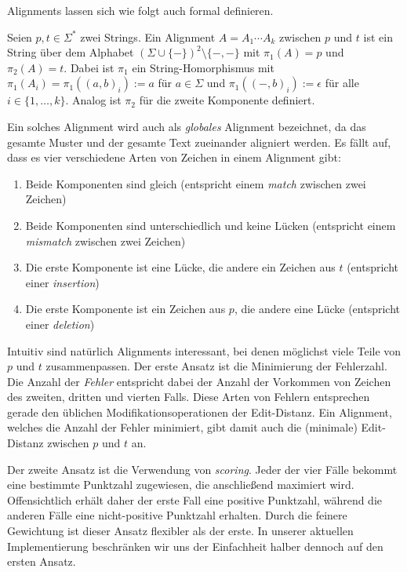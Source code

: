 Alignments lassen sich wie folgt auch formal definieren.

\begin{definition}
\label{def:align:basics:alignment}
Seien $p, t \in \Sigma^*$ zwei Strings. Ein Alignment $A = A_1 \cdots A_k$ zwischen $p$ und $t$ ist ein String über dem Alphabet $\left( \Sigma \cup \{ - \} \right)^2 \setminus \{ -,-\}$ mit $\pi_1(A) = p$ und $\pi_2(A) = t$. Dabei ist $\pi_1$ ein String-Homorphismus mit $\pi_1(A_i) = \pi_1((a,b)_i) := a$ für $a \in \Sigma$ und $\pi_1((-,b)_i) := \epsilon$ für alle $i \in \{1, \ldots, k\}$. Analog ist $\pi_2$ für die zweite Komponente definiert.
\end{definition}

Ein solches Alignment wird auch als \textit{globales} Alignment bezeichnet, da das gesamte Muster und der gesamte Text zueinander aligniert werden. Es fällt auf, dass es vier verschiedene Arten von Zeichen in einem Alignment gibt:

\begin{enumerate}
\item Beide Komponenten sind gleich (entspricht einem \textit{match} zwischen zwei Zeichen)
\item Beide Komponenten sind unterschiedlich und keine Lücken (entspricht einem \textit{mismatch} zwischen zwei Zeichen)
\item Die erste Komponente ist eine Lücke, die andere ein Zeichen aus $t$ (entspricht einer \textit{insertion})
\item Die erste Komponente ist ein Zeichen aus $p$, die andere eine Lücke (entspricht einer \textit{deletion})
\end{enumerate}

Intuitiv sind natürlich Alignments interessant, bei denen möglichst viele Teile von $p$ und $t$ zusammenpassen. Der erste Ansatz ist die Minimierung der Fehlerzahl. Die Anzahl der \textit{Fehler} entspricht dabei der Anzahl der Vorkommen von Zeichen des zweiten, dritten und vierten Falls. Diese Arten von Fehlern entsprechen gerade den üblichen Modifikationsoperationen der Edit-Distanz. Ein Alignment, welches die Anzahl der Fehler minimiert, gibt damit auch die (minimale) Edit-Distanz zwischen $p$ und $t$ an.

Der zweite Ansatz ist die Verwendung von \textit{scoring}. Jeder der vier Fälle bekommt eine bestimmte Punktzahl zugewiesen, die anschließend maximiert wird. Offensichtlich erhält daher der erste Fall eine positive Punktzahl, während die anderen Fälle eine nicht-positive Punktzahl erhalten. Durch die feinere Gewichtung ist dieser Ansatz flexibler als der erste. In unserer aktuellen Implementierung beschränken wir uns der Einfachheit halber dennoch auf den ersten Ansatz.

